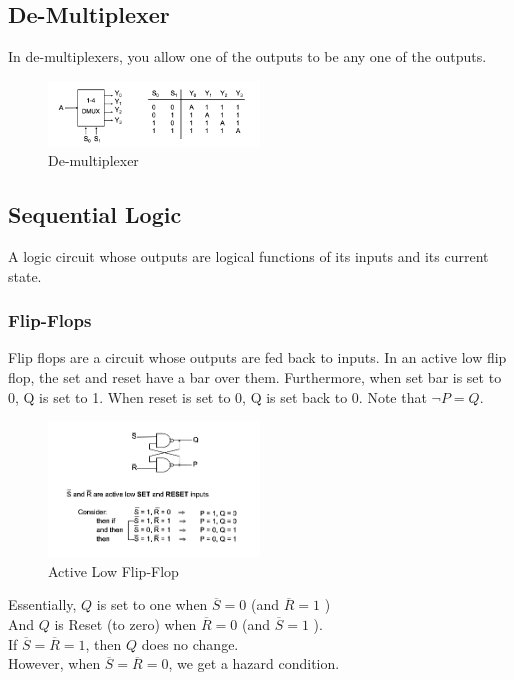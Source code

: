 \documentclass[a4paper]{article}
\theoremstyle{plain}
\theoremstyle{definition}
\theoremstyle{remark}
\begin{document}
\subsection{De-Multiplexer}
In de-multiplexers, you allow one of the outputs to be any one of the outputs.
\begin{figure}[H]
	\centering
	\includegraphics[width=0.5\textwidth]{figures/demultiplexer.png}
	\caption{De-multiplexer}
	\label{fig:figures-demultiplexer-png}
\end{figure}
\subsection{Sequential Logic}
A logic circuit whose outputs are logical functions of its inputs and its current state.
\subsubsection{Flip-Flops}
Flip flops are a circuit whose outputs are fed back to inputs. In an active low flip flop, the set and reset have a bar over them. Furthermore, when set bar is set to 0, Q is set to 1. When reset is set to 0, Q is set back to 0. Note that $\neg P = Q$. 
\begin{figure}[H]
	\centering
	\includegraphics[width=0.5\textwidth]{figures/flip.png}
	\caption{Active Low Flip-Flop}
	\label{fig:figures-flip-png}
\end{figure}	
Essentially, $Q$ is set to one when $\overline{S}=0$ (and $\overline{R}=1$ )\\
And $Q$ is Reset (to zero) when $\overline{R}=0$ (and $\overline{S}=1$ ). \\
If $\overline{S}=\overline{R}=1$, then $Q$ does no change. \\
However, when $\overline{S}=\overline{R}=0$, we get a hazard condition.
\end{document}
